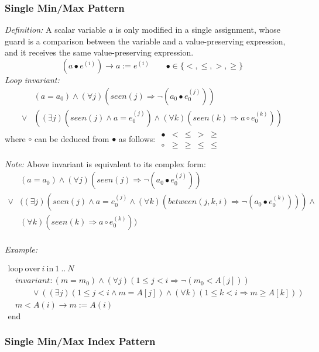 \documentclass[a4paper,10pt]{article}
\newcommand{\idx}{\ensuremath{i}\xspace}
\newcommand{\at}[1]{{(#1)}}
\newcommand{\KWloop}{\ensuremath{\mathrm{loop}~}}
\newcommand{\KWend}{\ensuremath{\mathrm{end}~}}
\newcommand{\KWover}{\ensuremath{\mathrm{over}~}}
\newcommand{\KWin}{\ensuremath{~\mathrm{in}~}}
\newcommand{\impl}{\ensuremath{\Longrightarrow}}
\newcommand{\seen}[1]{\ensuremath{\mathit{seen}(#1)}\xspace}
\newcommand{\between}[3]{\ensuremath{\mathit{between}{(#1,#2,#3)}}\xspace}
\newcommand{\loopinvariant}{\noindent\textit{Loop invariant:}\xspace}
\newcommand{\patterndef}{\noindent\textit{Definition:}\xspace}
\newcommand{\patternexample}{\noindent\textit{Example:}\xspace}
\newcommand{\patternnote}{\noindent\textit{Note:}\xspace}
\begin{document}
\subsubsection*{Single Min/Max Pattern}

\patterndef A scalar variable $a$ is only modified in a single assignment, whose
guard is a comparison between the variable and a value-preserving expression, and
it receives the same value-preserving expression.
%
$$(a \bullet e^\at{\idx}) \rightarrow a := e^\at{\idx}  \qquad \bullet \in \{<, \leq, >, \geq \}$$
%
\loopinvariant
%
\begin{eqnarray*}
&(a = a_0) \land (\forall j)(\seen{j} \impl \neg (a_0 \bullet e_0^\at{j}))\\
\lor 
& ((\exists j)(\seen{j} \land a = e_0^\at{j}) \land (\forall k)(\seen{k} \impl a \circ e_0^\at{k}))
\end{eqnarray*}
where $\circ$ can be deduced from $\bullet$ as follows:
$\begin{array}{l|llll}
\bullet & <    & \leq & >    & \geq \\ \hline
\circ   & \geq & \geq & \leq & \leq
\end{array}$

\bigskip
\patternnote Above invariant is equivalent to its complex form:
\begin{eqnarray*}
&(a = a_0) \land (\forall j)(\seen{j} \impl \neg (a_0 \bullet e_0^\at{j}))\\
\lor 
& ((\exists j)(\seen{j} \land a = e_0^\at{j} \land (\forall k)(\between{j}{k}{i} \impl \neg (a_0 \bullet e_0^\at{k}))) \land \\
&(\forall k)(\seen{k} \impl a \circ e_0^\at{k}))\\
\end{eqnarray*}

\bigskip
\patternexample

\medskip
$\begin{array}{l}
  \KWloop \KWover i \KWin 1~..~N \\
  ~~~~ \textit{invariant}: (m = m_0) \land (\forall j)(1\leq j < i \impl \neg (m_0 < A[j]))\\
  ~~~~~~~~~~~~~ \lor ((\exists j)(1\leq j < i \land m = A[j]) \land (\forall k)(1\leq k < i \impl m \geq A[k]))\\
  ~~~~ m < A(i) \rightarrow m := A(i)\\
  \KWend
\end{array}$

\subsubsection*{Single Min/Max Index Pattern}
\end{document}
